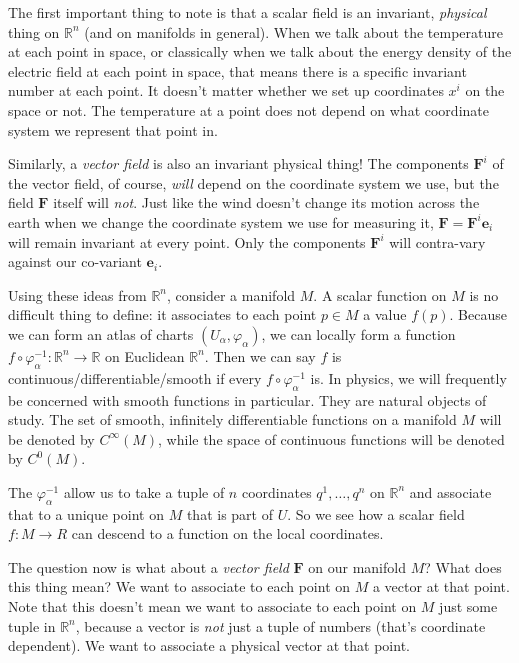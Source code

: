 \documentclass[../master.tex]{subfiles}
\begin{document}
	The first important thing to note is that a scalar field is an invariant, \emph{physical} thing on $\mathbb{R}^n$ (and on manifolds in general). When we talk about the temperature at each point in space, or classically when we talk about the energy density of the electric field at each point in space, that means there is a specific invariant number at each point. It doesn't matter whether we set up coordinates $x^i$ on the space or not. The temperature at a point does not depend on what coordinate system we represent that point in. 
	
	Similarly, a \emph{vector field} is also an invariant physical thing! The components $\mathbf F^i$ of the vector field, of course, \emph{will} depend on the coordinate system we use, but the field $\mathbf{F}$ itself will \emph{not}. Just like the wind doesn't change its motion across the earth when we change the coordinate system we use for measuring it, $\mathbf{F} = \mathbf{F}^i \mathbf e_i$ will remain invariant at every point. Only the components $\mathbf{F}^i$ will contra-vary against our co-variant $\mathbf e_i$.
	
	Using these ideas from $\mathbb{R}^n$, consider a manifold $M$. A scalar function on $M$ is no difficult thing to define: it associates to each point $p \in M$ a value $f(p)$. Because we can form an atlas of charts $(U_\alpha, \varphi_\alpha)$, we can locally form a function $f \circ \varphi_\alpha^{-1} : \mathbb{R}^n \rightarrow \mathbb R$ on Euclidean $\mathbb{R}^n$. Then we can say $f$ is continuous/differentiable/smooth if every $f \circ \varphi_\alpha^{-1}$ is. In physics, we will frequently be concerned with smooth functions in particular. They are natural objects of study. The set of smooth, infinitely differentiable functions on a manifold $M$ will be denoted by $C^\infty(M)$, while the space of continuous functions will be denoted by $C^0(M)$.
	
	The $\varphi_\alpha^{-1}$ allow us to take a tuple of $n$ coordinates $q^1, \dots, q^n$ on $\mathbb{R}^n$ and associate that to a unique point on $M$ that is part of $U$. So we see how a scalar field $f: M \rightarrow R$ can descend to a function on the local coordinates. 
	
	
	The question now is what about a \emph{vector field} $\mathbf{F}$ on our manifold $M$? What does this thing mean? We want to associate to each point on $M$ a vector at that point. Note that this doesn't mean we want to associate to each point on $M$ just some tuple in $\mathbb{R}^n$, because a vector is \emph{not} just a tuple of numbers (that's coordinate dependent). We want to associate a physical vector at that point. 
	
\end{document}

